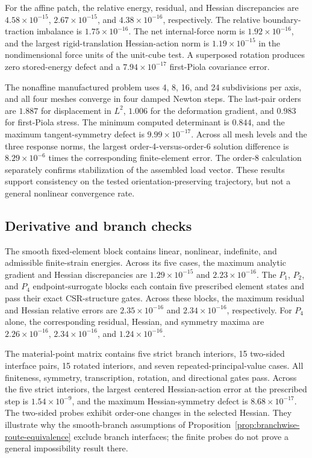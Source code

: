 For the affine patch, the relative energy, residual, and Hessian discrepancies
are $4.58\times10^{-15}$, $2.67\times10^{-15}$, and
$4.38\times10^{-16}$, respectively. The relative boundary-traction imbalance
is $1.75\times10^{-16}$. The net internal-force norm is
$1.92\times10^{-16}$, and the largest rigid-translation Hessian-action norm is
$1.19\times10^{-15}$ in the nondimensional force units of the unit-cube test.
A superposed rotation produces zero stored-energy defect and a
$7.94\times10^{-17}$ first-Piola covariance error.

The nonaffine manufactured problem uses 4, 8, 16, and 24 subdivisions per
axis, and all four meshes converge in four damped Newton steps. The last-pair
orders are $1.887$ for displacement in $L^2$, $1.006$ for the deformation
gradient, and $0.983$ for first-Piola stress. The minimum computed determinant
is $0.844$, and the maximum tangent-symmetry defect is
$9.99\times10^{-17}$. Across all mesh levels and the three response norms, the
largest order-4-versus-order-6 solution difference is
$8.29\times10^{-6}$ times the corresponding finite-element error. The order-8
calculation separately confirms stabilization of the assembled load vector.
These results support consistency on the tested orientation-preserving
trajectory, but not a general nonlinear convergence rate.

\subsection{Derivative and branch checks}
\label{subsec:derivative-verification}

The smooth fixed-element block contains linear, nonlinear, indefinite, and
admissible finite-strain energies. Across its five cases, the maximum analytic
gradient and Hessian discrepancies are $1.29\times10^{-15}$ and
$2.23\times10^{-16}$. The $P_1$, $P_2$, and $P_4$ endpoint-surrogate blocks each
contain five prescribed element states and pass their exact CSR-structure gates.
Across these blocks, the maximum residual and Hessian relative errors are
$2.35\times10^{-16}$ and $2.34\times10^{-16}$, respectively. For $P_4$
alone, the corresponding residual, Hessian, and symmetry maxima are
$2.26\times10^{-16}$, $2.34\times10^{-16}$, and
$1.24\times10^{-16}$.

The material-point matrix contains five strict branch interiors, 15 two-sided
interface pairs, 15 rotated interiors, and seven repeated-principal-value
cases. All finiteness, symmetry, transcription, rotation, and directional
gates pass. Across the five strict interiors, the largest centered
Hessian-action error at the prescribed step is $1.54\times10^{-9}$, and the
maximum Hessian-symmetry defect is $8.68\times10^{-17}$. The two-sided probes
exhibit order-one changes in the selected Hessian. They illustrate why the
smooth-branch assumptions of
Proposition~\ref{prop:branchwise-route-equivalence} exclude branch interfaces;
the finite probes do not prove a general impossibility result there.


